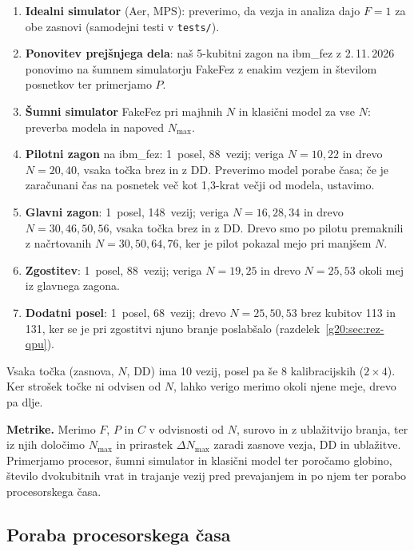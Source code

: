 \begin{enumerate}
\item \textbf{Idealni simulator} (Aer, MPS): preverimo, da vezja in analiza dajo $F=1$ za obe zasnovi (samodejni testi v
      \texttt{tests/}).
\item \textbf{Ponovitev prejšnjega dela}: naš 5-kubitni zagon na ibm\_fez z 2.\,11.\,2026 ponovimo na šumnem simulatorju
      FakeFez z enakim vezjem in številom posnetkov ter primerjamo $P$.
\item \textbf{Šumni simulator} FakeFez pri majhnih $N$ in klasični model za vse $N$: preverba modela in napoved $N_{\max}$.
\item \textbf{Pilotni zagon} na ibm\_fez: 1~posel, 88~vezij; veriga $N=10, 22$ in drevo $N=20, 40$, vsaka točka brez in z
      DD. Preverimo model porabe časa; če je zaračunani čas na posnetek več kot 1,3-krat večji od modela, ustavimo.
\item \textbf{Glavni zagon}: 1~posel, 148~vezij; veriga $N=16, 28, 34$ in drevo $N=30, 46, 50, 56$, vsaka točka brez in z DD.
      Drevo smo po pilotu premaknili z načrtovanih $N=30, 50, 64, 76$, ker je pilot pokazal mejo pri manjšem $N$.
\item \textbf{Zgostitev}: 1~posel, 88~vezij; veriga $N=19, 25$ in drevo $N=25, 53$ okoli mej iz glavnega zagona.
\item \textbf{Dodatni posel}: 1~posel, 68~vezij; drevo $N=25, 50, 53$ brez kubitov 113 in 131, ker se je pri zgostitvi njuno
      branje poslabšalo (razdelek~\ref{g20:sec:rez-qpu}).
\end{enumerate}
Vsaka točka (zasnova, $N$, DD) ima 10 vezij, posel pa še 8 kalibracijskih ($2\times4$). Ker strošek točke ni odvisen od $N$,
lahko verigo merimo okoli njene meje, drevo pa dlje.

\textbf{Metrike.} Merimo $F$, $P$ in $C$ v odvisnosti od $N$, surovo in z ublažitvijo branja, ter iz njih določimo $N_{\max}$ in
prirastek $\Delta N_{\max}$ zaradi zasnove vezja, DD in ublažitve. Primerjamo procesor, šumni simulator in klasični model ter
poročamo globino, število dvokubitnih vrat in trajanje vezij pred prevajanjem in po njem ter porabo procesorskega časa.

\subsection{Poraba procesorskega časa}
\label{g20:sec:cas}

